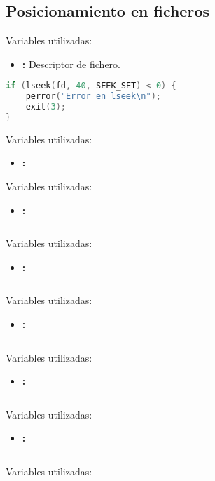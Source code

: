 \subsection{Posicionamiento en ficheros}

Variables utilizadas:

\begin{itemize}
	\item{}\textbf{:} Descriptor de fichero.
\end{itemize}

\begin{lstlisting}[language=C]
if (lseek(fd, 40, SEEK_SET) < 0) {
	perror("Error en lseek\n");
	exit(3);
}
\end{lstlisting}


Variables utilizadas:

\begin{itemize}
	\item\code{}\textbf{:}
\end{itemize}
Variables utilizadas:

\begin{itemize}
	\item\code{}\textbf{:}
\end{itemize}
\begin{lstlisting}[language=C]
\end{lstlisting}
Variables utilizadas:

\begin{itemize}
	\item\code{}\textbf{:}
\end{itemize}
\begin{lstlisting}[language=C]
\end{lstlisting}
Variables utilizadas:

\begin{itemize}
	\item\code{}\textbf{:}
\end{itemize}
\begin{lstlisting}[language=C]
\end{lstlisting}
Variables utilizadas:

\begin{itemize}
	\item\code{}\textbf{:}
\end{itemize}
\begin{lstlisting}[language=C]
\end{lstlisting}
Variables utilizadas:

\begin{itemize}
	\item\code{}\textbf{:}
\end{itemize}
\begin{lstlisting}[language=C]
\end{lstlisting}
Variables utilizadas:

